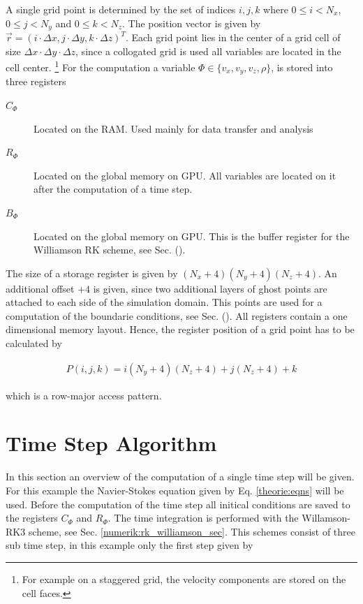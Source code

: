 A single grid point is determined by the set of indices $i,j,k$ where ${0\leq i < N_x}$,
${0\leq j < N_y}$ and ${0\leq k < N_z}$. The position vector is given by ${\vec{r} = (i\cdot\Delta x, j\cdot \Delta y, k\cdot \Delta z)^T}$.
Each grid point lies in the center of a grid cell of size $\Delta x \cdot \Delta y \cdot \Delta z$,
since a collogated grid is used all variables are located in the cell center.
\footnote{For example on a staggered grid, the velocity components are stored on the cell faces.}
For the computation a variable $\Phi\in\{v_x, v_y, v_z, \rho\}$, is stored into three registers

\begin{description}
    \item[$C_\Phi$] Located on the RAM. Used mainly for data transfer and analysis
    \item[$R_\Phi$] Located on the global memory on GPU. All variables are located on it after the computation of a time step.
    \item[$B_\Phi$] Located on the global memory on GPU. This is the buffer register for the Williamson RK scheme, see Sec. ().
\end{description}

The size of a storage register is given by $(N_x+4)(N_y+4)(N_z+4)$.
An additional offset $+4$ is given, since two additional layers of ghost points are attached to each side of the simulation domain.
This points are used for a computation of the boundarie conditions, see Sec. ().
All registers contain a one dimensional memory layout.
Hence, the register position of a grid point has to be calculated by

\begin{align}
    P(i, j, k) = i(N_y+4)(N_z+4)+j(N_z+4)+k
\end{align}

which is a row-major access pattern.

\section{Time Step Algorithm}

In this section an overview of the computation of a single time step will be given.
For this example the Navier-Stokes equation given by Eq. \ref{theorie:eqns} will be used.
Before the computation of the time step all initical conditions are saved to the
registers $C_{\Phi}$ and  $R_{\Phi}$.
The time integration is performed with the Willamson-RK3 scheme, see Sec. \ref{numerik:rk_williamson_sec}.
This schemes consist of three sub time step, in this example only the first step given by

